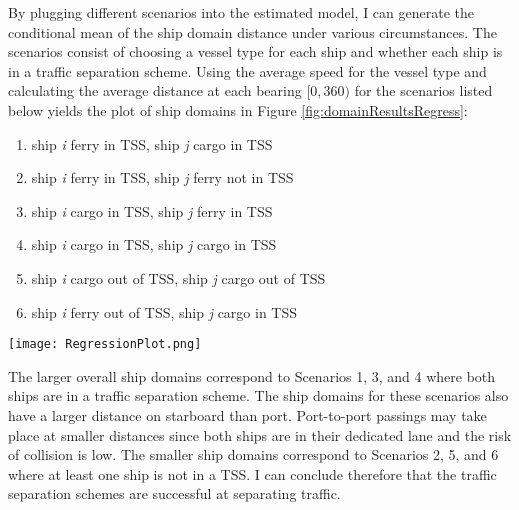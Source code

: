 \documentclass[twoside,symmetric,notoc]{tufte-book}
\begin{document}
\par{%
By plugging different scenarios into the estimated model, I can generate the conditional mean of the ship domain distance under various circumstances. The scenarios consist of choosing a vessel type for each ship and whether each ship is in a traffic separation scheme. Using the average speed for the vessel type and calculating the average distance at each bearing $[0, 360)$ for the scenarios listed below yields the plot of ship domains in Figure \ref{fig:domainResultsRegress}:
\begin{enumerate}
    \item ship \textit{i} ferry in TSS, ship \textit{j} cargo in TSS
    \item ship \textit{i} ferry in TSS, ship \textit{j} ferry not in TSS
    \item ship \textit{i} cargo in TSS, ship \textit{j} ferry in TSS
    \item ship \textit{i} cargo in TSS, ship \textit{j} cargo in TSS
    \item ship \textit{i} cargo out of TSS, ship \textit{j} cargo out of TSS
    \item ship \textit{i} ferry out of TSS, ship \textit{j} cargo in TSS
\end{enumerate}
\begin{figure*}
    \centering
    \texttt{[image: RegressionPlot.png]}
    \caption{The observed ship domains appear larger on the starboard and aft of the ship.}
    \label{fig:domainResultsRegress}
\end{figure*}
The larger overall ship domains correspond to Scenarios 1, 3, and 4 where both ships are in a traffic separation scheme. The ship domains for these scenarios also have a larger distance on starboard than port. Port-to-port passings may take place at smaller distances since both ships are in their dedicated lane and the risk of collision is low. The smaller ship domains correspond to Scenarios 2, 5, and 6 where at least one ship is not in a TSS.  I can conclude therefore that the traffic separation schemes are successful at separating traffic.
}
\end{document}
